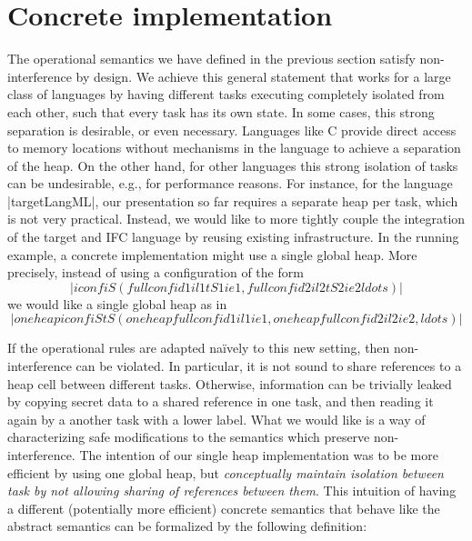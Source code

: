 \section{Concrete implementation}
\label{sec:concrete}

\newcommand{\con}[1]{\ensuremath{{\color{red} #1}}}
\newcommand{\abs}[1]{\ensuremath{{\color{blue} #1}}}

The operational semantics we have defined in the previous section
satisfy non-interference by design.
We achieve this general statement that works for a large class of
languages by having different tasks executing completely isolated from
each other, such that every task has its own state.
In some cases, this strong separation is desirable, or even necessary.
Languages like C provide direct access to memory locations without
mechanisms in the language to achieve a separation of the heap.
On the other hand, for other languages this
strong isolation of tasks can be
undesirable, e.g., for performance reasons.
For instance, for the language |targetLangML|, our presentation so far
requires a separate heap per task, which is not very practical.
Instead, we would like to
more tightly couple the integration of the target and IFC
language by reusing existing infrastructure.  In the running example,
a concrete implementation might use a single global heap.
More precisely, instead of using a configuration of the form
\[|iconf iS (fullconf id1 il1 tS1 ie1, fullconf id2 il2 tS2 ie2 ldots)|\]
we would like a single global heap as in
\[|oneheapiconf iS tS (oneheapfullconf id1 il1 ie1, oneheapfullconf id2 il2 ie2, ldots)|\]

If the operational rules are adapted na\"ively to this new setting,
then non-interference can be violated.  In particular, it is not
sound to share references to a heap cell between different tasks.
Otherwise, information can be trivially leaked by copying
secret data to a shared reference in one task, and then
reading it again by a another task with a lower label.
What we would like is a way of characterizing safe modifications to
the semantics which preserve non-interference.
The intention of our single heap implementation was to be more efficient
by using one global heap, but \emph{conceptually maintain isolation between
task by not allowing sharing of references between them}.
This intuition of having a different (potentially more efficient)
concrete semantics that behave like the abstract semantics
can be formalized by the following definition:


